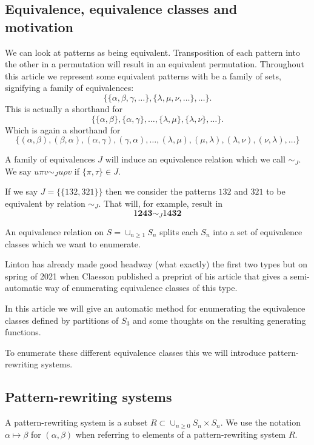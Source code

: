 \documentclass[a4paper, 11pt, english]{article}
\newcommand{\patternrule}{ \mapsto \!}
\theoremstyle{definition}
\newcommand{\Sym}{S}
\begin{document}
\subsection{Equivalence, equivalence classes and motivation}
We can look at patterns as being equivalent. Transposition of each pattern into
the other in a permutation will result in an equivalent permutation. Throughout
this article we represent some equivalent patterns with be a family of sets, signifying
a family of equivalences:
\[
    \{ \{\alpha, \beta, \gamma, \dots \}, \{\lambda, \mu, \nu, \dots \}, \dots
    \}.
\]
This is actually a shorthand for
\[
    \{ \{ \alpha, \beta \}, \{ \alpha, \gamma \}, \dots, \{ \lambda, \mu \}, \{
        \lambda, \nu \}, \dots \}.
\]
Which is again a shorthand for
\[
    \{ (\alpha, \beta), (\beta, \alpha), (\alpha, \gamma), (\gamma, \alpha),
    \dots, (\lambda, \mu), (\mu, \lambda), (\lambda, \nu), (\nu, \lambda), \dots \}
\]

A family of equivalences $J$ will induce an equivalence relation which we call $\sim_J$. We
say $u \pi v \sim_J u \rho v$ if $\{ \pi, \tau \} \in J$.

If we say $J = \{ \{ 132, 321 \} \}$ then we consider the patterns $132$ and $321$ to
be equivalent by relation $\sim_J$. That will, for example, result in
\[
    1\bm{243} \sim_J 1\bm{432}
\]

An equivalence relation on $\Sym = \cup_{n \geq 1} \Sym_n$ splits each $\Sym_n$
into a set of equivalence classes which we want to enumerate. 

Linton has already made good headway (what exactly) the first two types but on
spring of 2021 when Claesson published a preprint of his article that gives a
semi-automatic way of enumerating equivalence classes of this type.

In this article we will give an automatic method for enumerating the equivalence
classes defined by partitions of $\Sym_3$ and some thoughts on the resulting generating functions.

To enumerate these different equivalence classes this we will introduce
pattern-rewriting systems.

\subsection{Pattern-rewriting systems}
A pattern-rewriting system is a subset $R \subset \cup_{n \geq 0} \Sym_n \times \Sym_n$.
We use the notation $\alpha \patternrule \beta$ for $(\alpha, \beta)$ when referring
to elements of a pattern-rewriting system $R$. 
\end{document}
